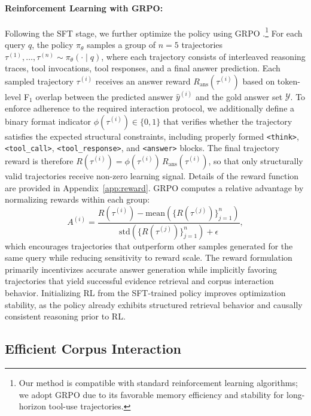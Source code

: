 \documentclass{llmxive}
\begin{document}
\paragraph{Reinforcement Learning with GRPO:}

Following the SFT stage, we further optimize the policy using GRPO \citep{grpo}.\footnote{Our method is compatible with standard reinforcement learning algorithms; we adopt GRPO due to its favorable memory efficiency and stability for long-horizon tool-use trajectories.} For each query $q$, the policy $\pi_\theta$ samples a group of $n=5$ trajectories
$\tau^{(1)}, \dots, \tau^{(n)} \sim \pi_\theta(\cdot \mid q)$,
where each trajectory consists of interleaved reasoning traces, tool invocations, tool responses, and a final answer prediction. Each sampled trajectory $\tau^{(i)}$ receives an answer reward
$R_{\mathrm{ans}}(\tau^{(i)})$ based on token-level F$_1$ \citep{rajpurkar-etal-2016-squad} overlap between the predicted answer $\hat{y}^{(i)}$ and the gold answer set $\mathcal{Y}$. To enforce adherence to the required interaction protocol, we additionally define a binary format indicator
$\phi(\tau^{(i)}) \in \{0,1\}$ that verifies whether the trajectory satisfies the expected structural constraints, including properly formed \texttt{<think>}, \texttt{<tool\_call>}, \texttt{<tool\_response>}, and \texttt{<answer>} blocks. The final trajectory reward is therefore
$R(\tau^{(i)}) = \phi(\tau^{(i)})\, R_{\mathrm{ans}}(\tau^{(i)})$, so that only structurally valid trajectories receive non-zero learning signal. Details of the reward function are provided in Appendix~\ref{app:reward}. GRPO computes a relative advantage by normalizing rewards within each group:
\[
A^{(i)} =
\frac{
R(\tau^{(i)}) - \mathrm{mean}(\{R(\tau^{(j)})\}_{j=1}^{n})
}{
\mathrm{std}(\{R(\tau^{(j)})\}_{j=1}^{n}) + \epsilon
},
\]
which encourages trajectories that outperform other samples generated for the same query while reducing sensitivity to reward scale. The reward formulation primarily incentivizes accurate answer generation while implicitly favoring trajectories that yield successful evidence retrieval and corpus interaction behavior. Initializing RL from the SFT-trained policy improves optimization stability, as the policy already exhibits structured retrieval behavior and causally consistent reasoning prior to RL.


\subsection{Efficient Corpus Interaction}
\label{sec:fast-retrieval}
\end{document}
